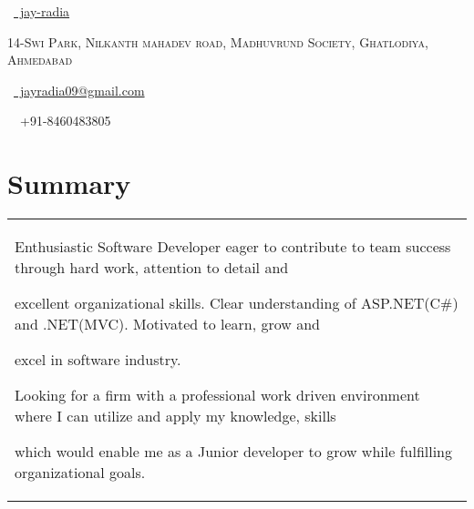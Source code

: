 \documentclass[a4paper,10pt]{extarticle} %
\def\faLinkedin{\symbol{"F0E1}}
\def\faEnvelope{\symbol{"F003}}
\def\faPhone{\symbol{"F095}}
\def\linkedin{{\FA \faLinkedin}}
\def\envelope{{\FA \faEnvelope}}
\def\phone{{\FA \faPhone}}
\begin{document}
	
	\pagestyle{empty} %
	
	
	\begin{multicols}{3}
		

		\normalsize  \linkedin\ {\href{https://www.linkedin.com/in/jay-radia-940998146/}{\  jay-radia}}\\
		\columnbreak
		\normalsize\par{\par} %
		\par{\centering\normalsize {\textsc{14-Swi Park, Nilkanth mahadev road, Madhuvrund Society, Ghatlodiya, 
					Ahmedabad
}}\hfill\par}
		\columnbreak
		\raggedright\hfill\normalsize \envelope\ {\href{mailto:jayradia09@gmail.com}{\  jayradia09@gmail.com}}\\
		\raggedright\hfill{\phone\ \  +91-8460483805}
		
	\end{multicols}
	
	
	
	\section{\textcolor{primary}{Summary}}
	\vspace{-0.5cm}
	\begin{tabular}{p{19.7cm}}
		\begin{description}
			
			
			\item Enthusiastic Software Developer eager to contribute to team success through hard work, attention to detail and
			\item excellent organizational skills. Clear understanding of ASP.NET(C\#) and .NET(MVC). Motivated to learn, grow and 
			\item excel in software industry.
			\item Looking for a firm with a professional work driven environment
			where I can utilize and apply my knowledge, skills
			\item which would enable me as a Junior developer to grow while fulfilling organizational goals.
		\end{description}
	\end{tabular}
	
\end{document}
